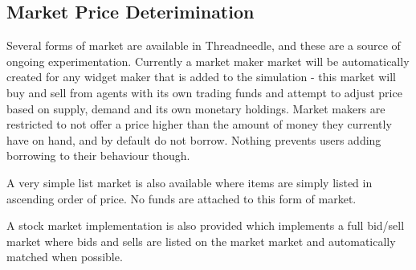 \documentclass[10pt,oneside,openright, a4paper]{memoir}
\begin{document}
\subsection{Market Price Deterimination}
Several forms of market are available in Threadneedle, and these
are a source of ongoing experimentation. Currently a market
maker market will be automatically created for any widget
maker that is added to the simulation - this market will buy
and sell from agents with its own trading funds and attempt
to adjust price based on supply, demand and its own monetary
holdings. Market makers are restricted to not offer a price
higher than the amount of money they currently have on hand,
and by default do not borrow. Nothing prevents users adding
borrowing to their behaviour though.
\par
A very simple list market is also available where items are simply
listed in ascending order of price. No funds are attached to this
form of market.
\par
A stock market implementation is also provided which implements
a full bid/sell market where bids and sells are listed on the market
market and automatically matched when possible.

\raggedright


%
\end{document}
